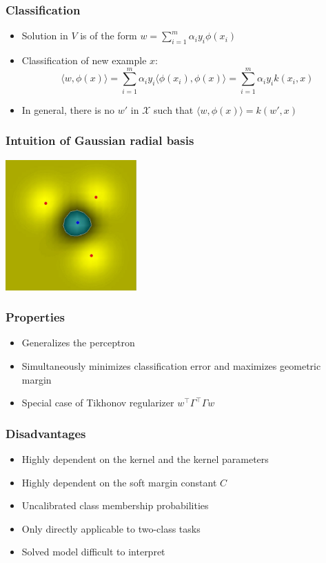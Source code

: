 \documentclass[10pt]{beamer}
\begin{document}
\begin{frame}
  \frametitle{Classification}
  \begin{itemize}
	\item Solution in $V$ is of the form $w=\sum_{i=1}^m\alpha_iy_i\phi(x_i)$
	\item {\color{red} Classification} of new example $x$:
	\[\langle w,\phi(x)\rangle=
		\sum_{i=1}^m\alpha_iy_i\langle\phi(x_i),\phi(x)\rangle=
		\sum_{i=1}^m\alpha_iy_ik(x_i,x)\]
	\item In general, there is no $w'$ in $\mathcal{X}$ such that
		$\langle w,\phi(x)\rangle=k(w',x)$
  \end{itemize}
\end{frame}

\begin{frame}
  \frametitle{Intuition of Gaussian radial basis}
  \centerline{\includegraphics[height=5cm]{images/radial.jpeg}}
\end{frame}

\begin{frame}
  \frametitle{Properties}
  \begin{itemize}
    \item Generalizes the perceptron
	\item Simultaneously minimizes {\color{red} classification error} and maximizes {\color{blue} geometric margin}
	\item Special case of {\color{green} Tikhonov regularizer} $w^{\top}\Gamma^{\top}\Gamma w$
  \end{itemize}
\end{frame}

\begin{frame}
  \frametitle{Disadvantages}
  \begin{itemize}
    \item Highly dependent on the kernel and the kernel parameters
	\item Highly dependent on the soft margin constant $C$
	\item Uncalibrated class membership probabilities
	\item Only directly applicable to two-class tasks
	\item Solved model difficult to interpret
  \end{itemize}
\end{frame}
\end{document}
